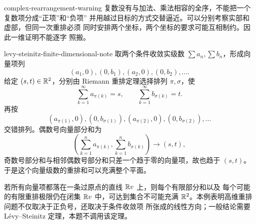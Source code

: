 \begin{solution}{complex-rearrangement-warning}
复数没有与加法、乘法相容的全序，不能把一个复数项分成“正项”和“负项”
并用越过目标的方式交替逼近。可以分别考察实部和虚部，但同一次重排必须
同时安排两个坐标，两个坐标的要求可能互相制约。因此一维证明不能逐字
照搬。
\end{solution}

\begin{solution}{levy-steinitz-finite-dimensional-note}
取两个条件收敛实级数 \(\sum a_n,\sum b_n\)，形成向量项列
\[
 (a_1,0),(0,b_1),(a_2,0),(0,b_2),\ldots.
\]
给定 \((s,t)\in\mathbb{R}^2\)，分别由 Riemann 重排定理选择排列
\(\pi,\sigma\)，使
\[
 \sum_{k=1}^{\infty}a_{\pi(k)}=s,\qquad
 \sum_{k=1}^{\infty}b_{\sigma(k)}=t.
\]
再按
\[
 (a_{\pi(1)},0),(0,b_{\sigma(1)}),
 (a_{\pi(2)},0),(0,b_{\sigma(2)}),\ldots
\]
交错排列。偶数号向量部分和为
\[
 \left(\sum_{k=1}^{n}a_{\pi(k)},
       \sum_{k=1}^{n}b_{\sigma(k)}\right)\longrightarrow(s,t),
\]
奇数号部分和与相邻偶数号部分和只差一个趋于零的向量项，故也趋于
\((s,t)\)。于是这个向量级数的重排和可以充满整个平面。

若所有向量项都落在一条过原点的直线 \(\mathbb{R} v\) 上，则每个有限部分和以及
每个可能的有限重排极限仍在闭集 \(\mathbb{R} v\) 中，可达到集合不可能充满
\(\mathbb{R}^2\)。本例表明高维重排问题不仅取决于正负号，还取决于条件收敛项
所张成的线性方向；一般结论需要 Lévy--Steinitz 定理，本题不调用该定理。
\end{solution}

